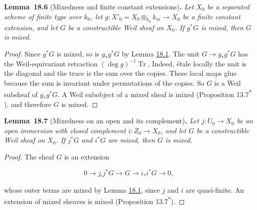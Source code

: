 \documentclass[11pt]{article}
\newenvironment{bpstatement}[2]{\par\addvspace{0.6\baselineskip}\noindent\textbf{#1}#2\textbf{.}\enspace\ignorespaces}
  {\par\addvspace{0.4\baselineskip}}
\newenvironment{bpstatementit}[2]{\begin{bpstatement}{#1}{#2}\itshape\ignorespaces}{\end{bpstatement}}
\newcommand{\bpout}[1]{#1\textsuperscript{\hyperlink{bp-outside}{\ensuremath{\ast}}}}
\begin{document}
\label{bp21}%
\begin{bpstatementit}{Lemma~18.6}{ (Mixedness and finite constant extensions)}
Let \(X_0\) be a separated scheme of finite type over \(k_0\), let \(g:X'_0=X_0\otimes_{k_0}k_m\to X_0\) be a finite constant extension, and let \(G\) be a constructible Weil sheaf on \(X_0\). If \(g^*G\) is mixed, then \(G\) is mixed.
\end{bpstatementit}

\begin{proof}[{Proof}]\label{bp22}%
Since \(g^*G\) is mixed, so is \(g_*g^*G\) by Lemma \hyperref[bp5]{18.1}. The unit \(G\to g_*g^*G\) has the Weil-equivariant retraction \((\deg g)^{-1}\operatorname{Tr}\). Indeed, étale locally the unit is the diagonal and the trace is the sum over the copies. These local maps glue because the sum is invariant under permutations of the copies. So \(G\) is a Weil subsheaf of \(g_*g^*G\). A Weil subobject of a mixed sheaf is mixed (Proposition \bpout{13.7}), and therefore \(G\) is mixed.
\end{proof}

\label{bp23}%
\begin{bpstatementit}{Lemma~18.7}{ (Mixedness on an open and its complement)}
Let \(j:U_0\to X_0\) be an open immersion with closed complement \(i:Z_0\to X_0\), and let \(G\) be a constructible Weil sheaf on \(X_0\). If \(j^*G\) and \(i^*G\) are mixed, then \(G\) is mixed.
\end{bpstatementit}

\begin{proof}[{Proof}]\label{bp24}%
The sheaf \(G\) is an extension

\[
0\longrightarrow j_!j^*G\longrightarrow G
\longrightarrow i_*i^*G\longrightarrow0,
\]

whose outer terms are mixed by Lemma \hyperref[bp5]{18.1}, since \(j\) and \(i\) are quasi-finite. An extension of mixed sheaves is mixed (Proposition \bpout{13.7}).
\end{proof}
\end{document}
